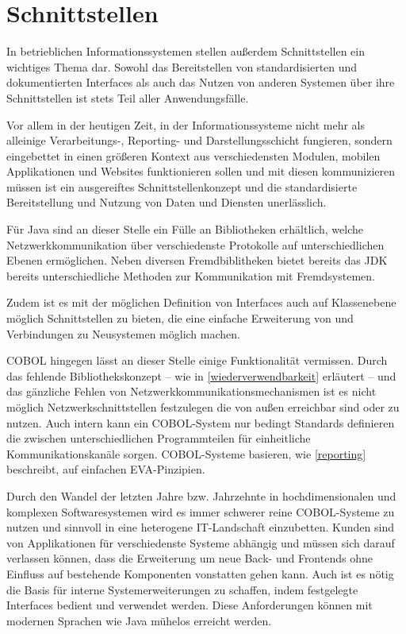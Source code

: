 \section{Schnittstellen}
In betrieblichen Informationssystemen stellen außerdem Schnittstellen ein wichtiges Thema dar. Sowohl das Bereitstellen von standardisierten und dokumentierten Interfaces als auch das Nutzen von anderen Systemen über ihre Schnittstellen ist stets Teil aller Anwendungsfälle. 

Vor allem in der heutigen Zeit, in der Informationssysteme nicht mehr als alleinige Verarbeitungs-, Reporting- und Darstellungsschicht fungieren, sondern eingebettet in einen größeren Kontext aus verschiedensten Modulen, mobilen Applikationen und Websites funktionieren sollen und mit diesen kommunizieren müssen ist ein ausgereiftes Schnittstellenkonzept und die standardisierte Bereitstellung und Nutzung von Daten und Diensten unerlässlich.

Für Java sind an dieser Stelle ein Fülle an Bibliotheken erhältlich, welche Netzwerkkommunikation über verschiedenste Protokolle auf unterschiedlichen Ebenen ermöglichen. Neben diversen Fremdbiblitheken bietet bereits das JDK bereits unterschiedliche Methoden zur Kommunikation mit Fremdsystemen.

Zudem ist es mit der möglichen Definition von Interfaces auch auf Klassenebene möglich Schnittstellen zu bieten, die eine einfache Erweiterung von und Verbindungen zu Neusystemen möglich machen.

COBOL hingegen lässt an dieser Stelle einige Funktionalität vermissen. Durch das fehlende Bibliothekskonzept -- wie in \autoref{wiederverwendbarkeit} erläutert -- und das gänzliche Fehlen von Netzwerkkommunikationsmechanismen ist es nicht möglich Netzwerkschnittstellen festzulegen die von außen erreichbar sind oder zu nutzen. Auch intern kann ein COBOL-System nur bedingt Standards definieren die zwischen unterschiedlichen Programmteilen für einheitliche Kommunikationskanäle sorgen. COBOL-Systeme basieren, wie \autoref{reporting} beschreibt, auf einfachen EVA-Pinzipien.

Durch den Wandel der letzten Jahre bzw. Jahrzehnte in hochdimensionalen und komplexen Softwaresystemen wird es immer schwerer reine COBOL-Systeme zu nutzen und sinnvoll in eine heterogene IT-Landschaft einzubetten. Kunden sind von Applikationen für verschiedenste Systeme abhängig und müssen sich darauf verlassen können, dass die Erweiterung um neue Back- und Frontends ohne Einfluss auf bestehende Komponenten vonstatten gehen kann. Auch ist es nötig die Basis für interne Systemerweiterungen zu schaffen, indem festgelegte Interfaces bedient und verwendet werden. Diese Anforderungen können mit modernen Sprachen wie Java mühelos erreicht werden.